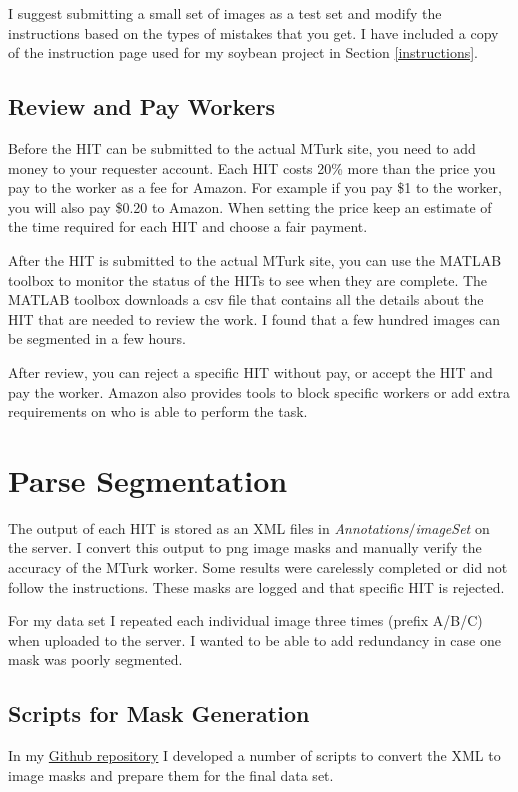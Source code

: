 \documentclass[a4paper]{article}
\begin{document}
I suggest submitting a small set of images as a test set and modify the instructions based on the types of mistakes that you get. I have included a copy of the instruction page used for my soybean project in Section \ref{instructions}. 

\subsection{Review and Pay Workers}
Before the HIT can be submitted to the actual MTurk site, you need to add money to your requester account. Each HIT costs 20\% more than the price you pay to the worker as a fee for Amazon. For example if you pay \$1 to the worker, you will also pay \$0.20 to Amazon. When setting the price keep an estimate of the time required for each HIT and choose a fair payment. 

After the HIT is submitted to the actual MTurk site, you can use the MATLAB toolbox to monitor the status of the HITs to see when they are complete. The MATLAB toolbox downloads a csv file that contains all the details about the HIT that are needed to review the work. I found that a few hundred images can be segmented in a few hours. 

After review, you can reject a specific HIT without pay, or accept the HIT and pay the worker. Amazon also provides tools to block specific workers or add extra requirements on who is able to perform the task. 

\section{Parse Segmentation}

The output of each HIT is stored as an XML files in \textit{Annotations$/$imageSet} on the server. I convert this output to png image masks and manually verify the accuracy of the MTurk worker. Some results were carelessly completed or did not follow the instructions. These masks are logged and that specific HIT is rejected. 

For my data set I repeated each individual image three times (prefix A/B/C) when uploaded to the server. I wanted to be able to add redundancy in case one mask was poorly segmented. 

\subsection{Scripts for Mask Generation}

In my \href{https://github.com/kekeller/LabelMeMaskParser}{Github repository} I developed a number of scripts to convert the XML to image masks and prepare them for the final data set. 
\end{document}
